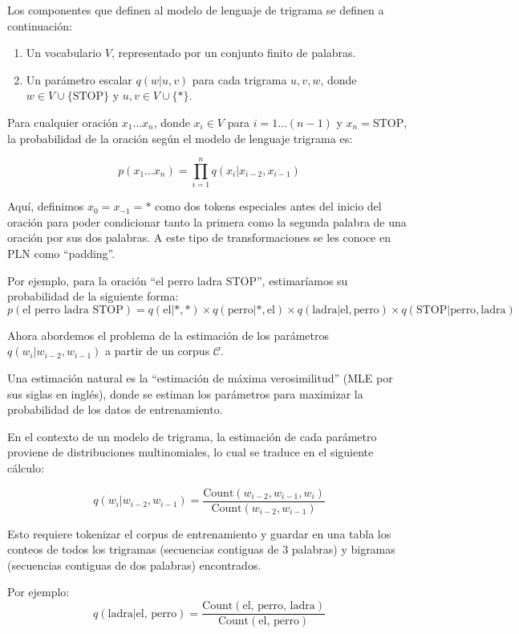 Los componentes que definen al modelo de lenguaje de trigrama se definen a continuación:

\begin{enumerate}
  \item Un vocabulario $V$, representado por un conjunto finito de palabras.
  \item Un parámetro escalar $q(w|u, v)$ para cada trigrama $u, v, w$, donde $w \in V \cup \{\text{STOP}\}$ y $u, v \in V \cup \{*\}$.
\end{enumerate}

Para cualquier oración $x_1 \ldots x_n$, donde $x_i \in V$ para $i = 1 \ldots (n-1)$ y $x_n = \text{STOP}$, la probabilidad de la oración según el modelo de lenguaje trigrama es:

\[
p(x_1 \ldots x_n) = \prod_{i=1}^{n} q(x_i|x_{i-2}, x_{i-1})
\]

Aquí, definimos $x_0 = x_{-1} = *$ como dos tokens especiales antes del inicio del oración para poder condicionar tanto la primera como la segunda palabra de una oración por sus dos palabras. A este tipo de transformaciones se les conoce en PLN como ``padding''.

Por ejemplo, para la oración ``el perro ladra STOP'', estimaríamos su probabilidad de la siguiente forma:
\[
p(\text{el perro ladra STOP}) = q(\text{el}|*, *) \times q(\text{perro}|*, \text{el}) \times q(\text{ladra}|\text{el}, \text{perro}) \times q(\text{STOP}|\text{perro}, \text{ladra})
\]

Ahora abordemos el problema de la estimación de los parámetros $q(w_i | w_{i-2}, w_{i-1})$ a partir de un corpus $\mathcal{C}$.

Una estimación natural es la ``estimación de máxima verosimilitud'' (MLE por sus siglas en inglés), donde se estiman los parámetros para maximizar la probabilidad de los datos de entrenamiento.

En el contexto de un modelo de trigrama, la estimación de cada parámetro proviene de distribuciones multinomiales, lo cual se traduce en el siguiente cálculo:

\[
q(w_i | w_{i-2}, w_{i-1}) = \frac{{\text{Count}(w_{i-2}, w_{i-1}, w_i)}}{{\text{Count}(w_{i-2}, w_{i-1})}}
\]

Esto requiere tokenizar el corpus de entrenamiento y guardar en una tabla los conteos de todos los trigramas (secuencias contiguas de 3 palabras) y bigramas (secuencias contiguas de dos palabras) encontrados.

Por ejemplo:
\[
q(\text{ladra} | \text{el, perro}) = \frac{{\text{Count}(\text{el, perro, ladra})}}{{\text{Count}(\text{el, perro})}}
\]




